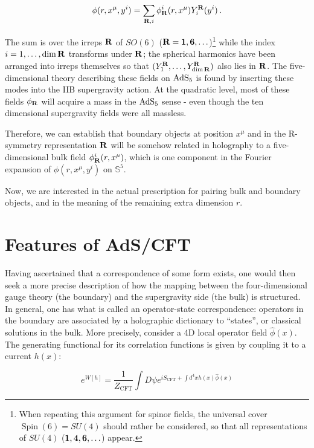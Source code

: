 \begin{equation}
	\phi(r,x^\mu,y^i) = \sum_{\mathbf{R},i}  \phi_{\mathbf{R}}^i(r,x^\mu) Y^{\mathbf{R}}_i (y^i)\,.
	\label{}
\end{equation}

The sum is over the irreps $\mathbf{R}$ of $SO(6)$ ($\mathbf{R} = \mathbf{1}, \mathbf{6}, \ldots$)\footnote{When repeating this argument for spinor fields, the universal cover $\operatorname{Spin}(6) = SU(4)$ should rather be considered, so that all representations of $SU(4)$ ($\mathbf{1}, \mathbf{4},\mathbf{6}, \ldots$) appear.} while the index $i = 1,\ldots,\dim \mathbf{R}$ transforms under $\mathbf{R}$; the spherical harmonics have been arranged into irreps themselves so that $(Y^{\mathbf{R}}_1, \ldots, Y^{\mathbf{R}}_{\dim \mathbf{R}} ) $ also lies in $\mathbf{R}$. The five-dimensional theory describing these fields on $\operatorname{AdS}_{5}$ is found by inserting these modes into the IIB supergravity action. At the quadratic level, most of these fields $\phi_{\mathbf{R}}$ will acquire a mass in the $\operatorname{AdS}_{5}$ sense - even though the ten dimensional supergravity fields were all massless.

Therefore, we can establish that boundary objects at position $x^\mu$ and in the R-symmetry representation $\mathbf{R}$ will be somehow related in holography to a five-dimensional bulk field $\phi^i_{\mathbf{R}} (r,x^\mu)$, which is one component in the Fourier expansion of $\phi(r,x^\mu,y^i)$ on $\mathbb{S}^5$.

Now, we are interested in the actual prescription for pairing bulk and boundary objects, and in the meaning of the remaining extra dimension $r$.

\section{Features of AdS/CFT}\label{sec:holofeatures}

Having ascertained that a correspondence of some form exists, one would then seek a more precise description of how the mapping between the four-dimensional gauge theory (the boundary) and the supergravity side (the bulk) is structured. In general, one has what is called an operator-state correspondence: operators in the boundary are associated by a holographic dictionary to ``states'', or classical solutions in the bulk. More precisely, consider a 4D local operator field $\hat \phi(x)$. The generating functional for its correlation functions is given by coupling it to a current $h(x)$:

\begin{equation}
	e^{W[h]} = \frac{1}{Z_\text{CFT}}\int D\psi e^{i S_\text{CFT} + \int d^4 x h(x) \hat \phi(x)}
\end{equation}

